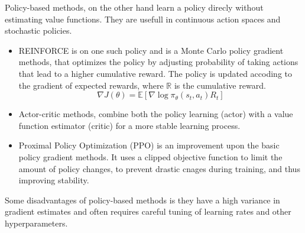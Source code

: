 Policy-based methods, on the other hand learn a policy direcly without estimating
value functions. They are usefull in continuous action spaces and stochastic policies.
\begin{itemize}
      \item REINFORCE is on one such policy and is a Monte Carlo policy gradient methods, 
      that optimizes the policy by adjusting probability of taking actions that lead to a 
      higher cumulative reward. The policy is updated accoding to the gradient of expected rewards,
      where \(\mathbb{R}\) is the cumulative reward. \cite{Types-of-Reinforcement-Learning}
      \begin{equation}
            \nabla J(\theta) = \mathbb{E} \left[\nabla \log \pi_{\theta}(s_t,a_t) R_t \right]
            \label{equation:policy_gradient}
      \end{equation}
      \item Actor-critic methods, combine both the policy learning (actor) with a value
      function estimator (critic) for a more stable learning process. \cite{Types-of-Reinforcement-Learning}
      \item Proximal Policy Optimization (PPO) is an improvement upon the basic policy
      gradient methods. It uses a clipped objective function to limit the amount of policy 
      changes, to prevent drastic cnages during training, and thus improving stability. \cite{Types-of-Reinforcement-Learning}
\end{itemize}
Some disadvantages of policy-based methods is they have a high variance in gradient estimates and often requires careful 
tuning of learning rates and other hyperparameters. \cite{Types-of-Reinforcement-Learning}

